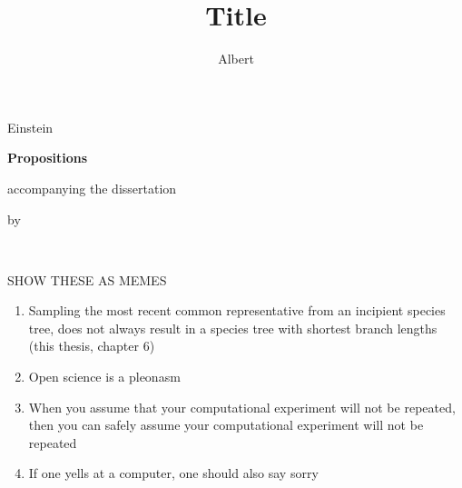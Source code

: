 \documentclass{dissertation}
\begin{document}
\title[Optional Subtitle]{Title}
\author{Albert}{Einstein}

\begin{center}

{\Large\titlefont\bfseries Propositions}

\bigskip

accompanying the dissertation

\bigskip

{\makeatletter
\titlestyle\bfseries\large\@title
\makeatother}

{\makeatletter
\ifx\@subtitle\undefined\else
    \titlefont\titleshape\@subtitle
\fi
\makeatother}

\bigskip

by

\bigskip

\makeatletter
{\large\titlefont\bfseries\@firstname\ {\titleshape\@lastname}}
\makeatother

\end{center}

\bigskip
\bigskip

SHOW THESE AS MEMES

\begin{enumerate}

\item Sampling the most recent common representative from an incipient
      species tree, does not always result in a species tree with shortest
      branch lengths (this thesis, chapter 6)
\item Open science is a pleonasm
\item When you assume that your computational experiment will not be repeated,
      then you can safely assume your computational experiment will not be repeated
\item If one yells at a computer, one should also say sorry
\end{enumerate}
\end{document}
